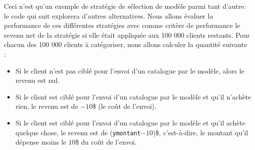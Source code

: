 \documentclass[
  11pt,
  letterpaper,
]{scrbook}
\newenvironment{Shaded}{\begin{snugshade}}{\end{snugshade}}
\newcommand{\AttributeTok}[1]{\textcolor[rgb]{0.40,0.45,0.13}{#1}}
\newcommand{\CommentTok}[1]{\textcolor[rgb]{0.37,0.37,0.37}{#1}}
\newcommand{\DecValTok}[1]{\textcolor[rgb]{0.68,0.00,0.00}{#1}}
\newcommand{\FunctionTok}[1]{\textcolor[rgb]{0.28,0.35,0.67}{#1}}
\newcommand{\NormalTok}[1]{\textcolor[rgb]{0.00,0.23,0.31}{#1}}
\newcommand{\OtherTok}[1]{\textcolor[rgb]{0.00,0.23,0.31}{#1}}
\newcommand{\SpecialCharTok}[1]{\textcolor[rgb]{0.37,0.37,0.37}{#1}}
\newcommand{\StringTok}[1]{\textcolor[rgb]{0.13,0.47,0.30}{#1}}
\providecommand{\tightlist}{%
  \setlength{\itemsep}{0pt}\setlength{\parskip}{0pt}}\usepackage{longtable,booktabs,array}
\theoremstyle{definition}
\theoremstyle{remark}
\begin{document}
\begin{Shaded}
\end{Shaded}

Ceci n'est qu'un exemple de stratégie de sélection de modèle parmi tant
d'autre: le code qui suit explorera d'autres alternatives. Nous allons
évaluer la performance de ces différentes stratégies avec comme critère
de performance le revenu net de la stratégie si elle était appliquée aux
100 000 clients restants. Pour chacun des 100 000 clients à catégoriser,
nous allons calculer la quantité suivante :

\begin{itemize}
\tightlist
\item
  Si le client n'est pas ciblé pour l'envoi d'un catalogue par le
  modèle, alors le revenu est nul.
\item
  Si le client est ciblé pour l'envoi d'un catalogue par le modèle et
  qu'il n'achète rien, le revenu est de \(-10\)\$ (le coût de l'envoi).
\item
  Si le client est ciblé pour l'envoi d'un catalogue par le modèle et
  qu'il achète quelque chose, le revenu est de
  (\texttt{ymontant}\(-10\))\$, c'est-à-dire, le montant qu'il dépense
  moins le \(10\)\$ du coût de l'envoi.
\end{itemize}
\end{document}
